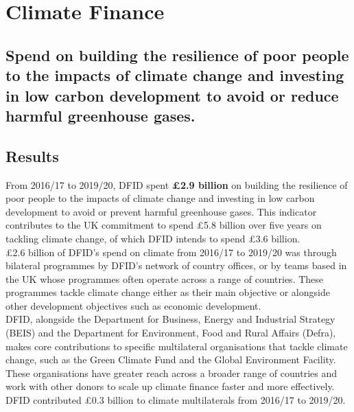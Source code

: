 \chapter{Climate Finance}

\section*{Spend on building the resilience of poor people to the impacts of climate change and investing in low carbon development to avoid or reduce harmful greenhouse gases.}

\bigskip
\bigskip


\thispagestyle{empty}


\section{Results}
From 2016/17 to 2019/20, DFID spent \textbf{\pounds 2.9 billion} on building the resilience of poor people to the impacts of climate change and investing in low carbon development to avoid or prevent harmful greenhouse gases. %
This indicator contributes to the UK commitment to spend  \pounds  5.8 billion over five years on tackling climate change, of which DFID intends to spend \pounds3.6 billion. \\ %





\pounds 2.6 billion of DFID's spend on climate from 2016/17 to 2019/20 was through bilateral programmes by DFID's network of country offices, or by teams based in the UK whose programmes often operate across a range of countries. %
These programmes tackle climate change either as their main objective or alongside other development objectives such as economic development. \\ %

DFID, alongside the Department for Business, Energy and Industrial Strategy (BEIS) and the Department for Environment, Food and Rural Affairs (Defra), makes core contributions to specific multilateral organisations that tackle climate change, such as the Green Climate Fund and the Global Environment Facility. %
These organisations have greater reach across a broader range of countries and work with other donors to scale up climate finance faster and more effectively. %
DFID contributed \pounds 0.3 billion to climate multilaterals from 2016/17 to 2019/20. %

